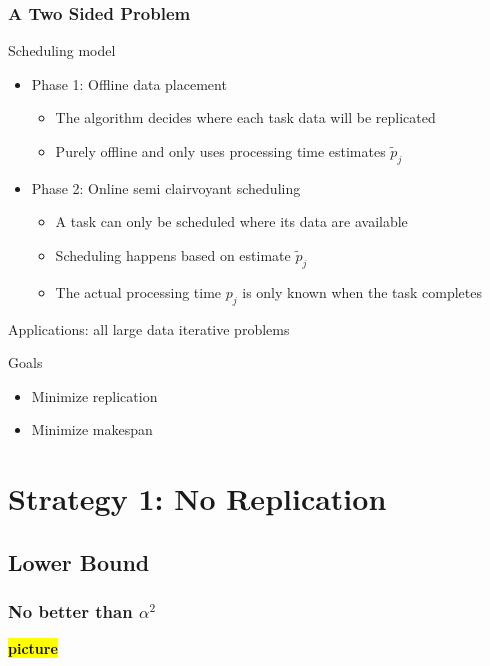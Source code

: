 \documentclass[usenames,dvipsnames]{beamer}
\newcommand{\todo}[1]{{\color{red}\textbf{\hl{#1}}\xspace}}
\begin{document}
\begin{frame}
  \frametitle{A Two Sided Problem}

  \begin{block}{Scheduling model}
    \begin{itemize}
    \item Phase 1: Offline data placement
      \begin{itemize}
      \item The algorithm decides where each task data will be
        replicated
      \item Purely offline and only uses processing time estimates $\tilde{p}_j$
      \end{itemize}
    \item Phase 2: Online semi clairvoyant scheduling
      \begin{itemize}
      \item A task can only be scheduled where its data are available
      \item Scheduling happens based on estimate $\tilde{p}_j$
      \item The actual processing time $p_j$ is only known when the task completes
      \end{itemize}
    \end{itemize}

    Applications: all large data iterative problems
  \end{block}
  
  \begin{block}{Goals}
    \begin{itemize}
    \item Minimize replication
    \item Minimize makespan
    \end{itemize}
  \end{block}
\end{frame}


\section{Strategy 1: No Replication}

\subsection{Lower Bound}

\begin{frame}
  \frametitle{No better than $\alpha^2$}

  \todo{picture}
\end{frame}
\end{document}
